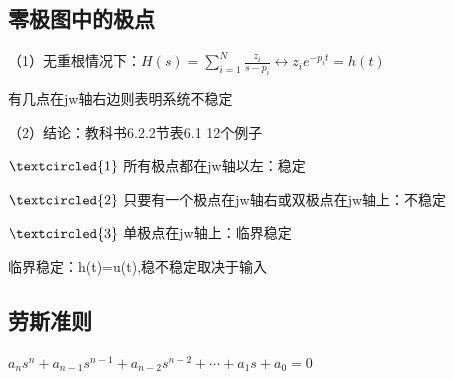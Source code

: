 \documentclass[UTF8]{ctexart}
\begin{document}
\subsection{零极图中的极点}
（1）无重根情况下：$H(s)=\sum_{i = 1}^{N} \frac{z_i}{s-p_i}\longleftrightarrow z_ie^{-p_it}=h(t)  $\par
有几点在jw轴右边则表明系统不稳定\par
（2）结论：教科书6.2.2节表6.1 \qquad 12个例子\par
$\textcircled{1} $ \; 所有极点都在jw轴以左：稳定 \par
$\textcircled{2} $ \; 只要有一个极点在jw轴右或双极点在jw轴上：不稳定 \par
$\textcircled{3} $ \; 单极点在jw轴上：临界稳定 \par
\qquad 临界稳定：h(t)=u(t),稳不稳定取决于输入 \par
\subsection{劳斯准则}
\qquad $a_ns^n+a_{n-1}s^{n-1}+a_{n-2}s^{n-2}+\cdots +a_{1}s+a_0=0$\par
\end{document}
